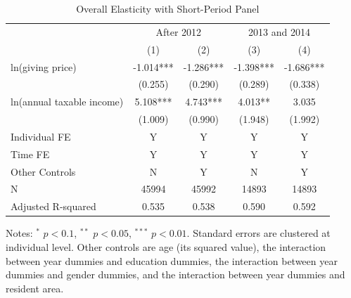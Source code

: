 \documentclass[
  11pt,
  a4paper,
]{article}
\begin{document}
\begin{table}

\caption{\label{tab:ShortOverall}Overall Elasticity with Short-Period Panel}
\centering
\fontsize{9}{11}\selectfont
\begin{threeparttable}
\begin{tabular}[t]{lcccc}
\toprule
\multicolumn{1}{c}{ } & \multicolumn{2}{c}{After 2012} & \multicolumn{2}{c}{2013 and 2014} \\
\cmidrule(l{3pt}r{3pt}){2-3} \cmidrule(l{3pt}r{3pt}){4-5}
 & (1) & (2) & (3) & (4)\\
\midrule
ln(giving price) & -1.014*** & -1.286*** & -1.398*** & -1.686***\\
 & (0.255) & (0.290) & (0.289) & (0.338)\\
ln(annual taxable income) & 5.108*** & 4.743*** & 4.013** & 3.035\\
 & (1.009) & (0.990) & (1.948) & (1.992)\\
Individual FE & Y & Y & Y & Y\\
Time FE & Y & Y & Y & Y\\
Other Controls & N & Y & N & Y\\
N & 45994 & 45992 & 14893 & 14893\\
Adjusted R-squared & 0.535 & 0.538 & 0.590 & 0.592\\
\bottomrule
\end{tabular}
\begin{tablenotes}
\item Notes: $^{*}$ $p < 0.1$, $^{**}$ $p < 0.05$, $^{***}$ $p < 0.01$. Standard errors are clustered at individual level. Other controls are age (its squared value), the interaction between year dummies and education dummies, the interaction between year dummies and gender dummies, and the interaction between year dummies and resident area.
\end{tablenotes}
\end{threeparttable}
\end{table}
\end{document}
